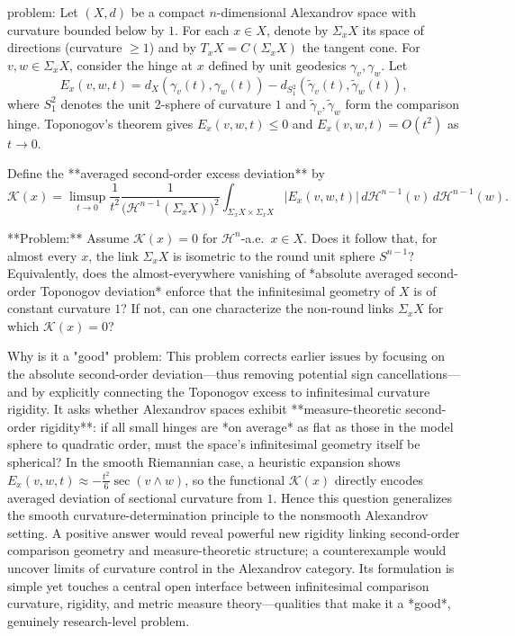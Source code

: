problem:  
Let \( (X,d) \) be a compact \(n\)-dimensional Alexandrov space with curvature bounded below by \(1\).  
For each \(x\in X\), denote by \( \Sigma_x X \) its space of directions (curvature \(\ge 1\)) and by
\(T_x X = C(\Sigma_xX)\) the tangent cone.  
For \(v,w\in\Sigma_xX\), consider the hinge at \(x\) defined by unit geodesics \(\gamma_v,\gamma_w\).  
Let  
\[
E_x(v,w,t) = d_X(\gamma_v(t),\gamma_w(t)) - d_{S^2_1}(\tilde{\gamma}_v(t),\tilde{\gamma}_w(t)),
\]
where \(S^2_1\) denotes the unit 2-sphere of curvature \(1\) and \(\tilde\gamma_v,\tilde\gamma_w\) form the comparison hinge.  
Toponogov’s theorem gives \(E_x(v,w,t)\le 0\) and \(E_x(v,w,t)=O(t^2)\) as \(t\to0\).

Define the **averaged second-order excess deviation** by
\[
\mathcal{K}(x)
   = \limsup_{t\to0}
     \frac{1}{t^2}
     \frac{1}{\big(\mathcal{H}^{n-1}(\Sigma_xX)\big)^2}
     \int_{\Sigma_xX\times\Sigma_xX} 
     |E_x(v,w,t)|\, d\mathcal{H}^{n-1}(v)\, d\mathcal{H}^{n-1}(w).
\]

**Problem:**  
Assume \( \mathcal{K}(x)=0 \) for \(\mathcal{H}^n\)-a.e.~\(x\in X\).  
Does it follow that, for almost every \(x\), the link \(\Sigma_xX\) is isometric to the round unit sphere \(S^{n-1}\)?  
Equivalently, does the almost-everywhere vanishing of *absolute averaged second-order Toponogov deviation* enforce that the infinitesimal geometry of \(X\) is of constant curvature \(1\)?  
If not, can one characterize the non-round links \(\Sigma_xX\) for which \(\mathcal{K}(x)=0\)?

Why is it a "good" problem:  
This problem corrects earlier issues by focusing on the absolute second-order deviation—thus removing potential sign cancellations—and by explicitly connecting the Toponogov excess to infinitesimal curvature rigidity.  
It asks whether Alexandrov spaces exhibit **measure-theoretic second-order rigidity**: if all small hinges are *on average* as flat as those in the model sphere to quadratic order, must the space’s infinitesimal geometry itself be spherical?  
In the smooth Riemannian case, a heuristic expansion shows \(E_x(v,w,t) \approx -\tfrac{t^2}{6}\sec(v\wedge w)\), so the functional \(\mathcal{K}(x)\) directly encodes averaged deviation of sectional curvature from \(1\).  
Hence this question generalizes the smooth curvature-determination principle to the nonsmooth Alexandrov setting.  
A positive answer would reveal powerful new rigidity linking second-order comparison geometry and measure-theoretic structure; a counterexample would uncover limits of curvature control in the Alexandrov category.  
Its formulation is simple yet touches a central open interface between infinitesimal comparison curvature, rigidity, and metric measure theory—qualities that make it a *good*, genuinely research-level problem.